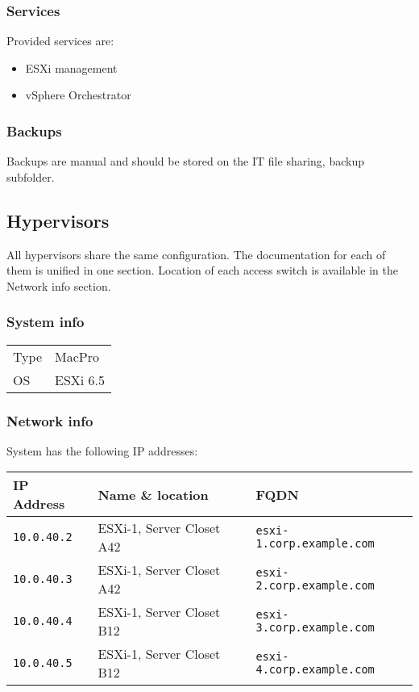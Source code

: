 \documentclass{demo}
\begin{document}
\subsubsection{Services}

Provided services are:

\begin{itemize}
  \item ESXi management
  \item vSphere Orchestrator
\end{itemize}

\subsubsection{Backups}

Backups are manual and should be stored on the IT file sharing, backup subfolder.

\subsection{Hypervisors}

All hypervisors share the same configuration. The documentation for each of them is unified in one section. Location of each access switch is available in the Network info section.

\subsubsection{System info}
\begin{tabularx}{\textwidth}{l|l}
 Type & MacPro \\
 OS & ESXi 6.5 \\
\end{tabularx}

\subsubsection{Network info}

System has the following IP addresses:

\begin{tabularx}{\textwidth}{l|ll}
 IP Address & Name \& location & FQDN \\
 \hline\endhead
 \texttt{10.0.40.2} & ESXi-1, Server Closet A42 & \texttt{esxi-1.corp.example.com} \\
 \texttt{10.0.40.3} & ESXi-1, Server Closet A42 & \texttt{esxi-2.corp.example.com} \\
 \texttt{10.0.40.4} & ESXi-1, Server Closet B12 & \texttt{esxi-3.corp.example.com} \\
 \texttt{10.0.40.5} & ESXi-1, Server Closet B12 & \texttt{esxi-4.corp.example.com} \\
\end{tabularx}
\end{document}
